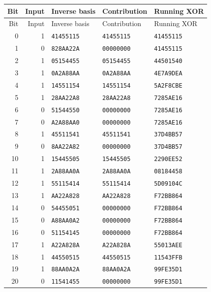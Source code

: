 \begingroup\small
\begin{longtable}{rrlll}
\toprule
Bit & Input & Inverse basis & Contribution & Running XOR\\
\midrule
\endfirsthead
\toprule
Bit & Input & Inverse basis & Contribution & Running XOR\\
\midrule
\endhead
0 & 1 & \texttt{41455115} & \texttt{41455115} & \texttt{41455115}\\
1 & 0 & \texttt{828AA22A} & \texttt{00000000} & \texttt{41455115}\\
2 & 1 & \texttt{05154455} & \texttt{05154455} & \texttt{44501540}\\
3 & 1 & \texttt{0A2A88AA} & \texttt{0A2A88AA} & \texttt{4E7A9DEA}\\
4 & 1 & \texttt{14551154} & \texttt{14551154} & \texttt{5A2F8CBE}\\
5 & 1 & \texttt{28AA22A8} & \texttt{28AA22A8} & \texttt{7285AE16}\\
6 & 0 & \texttt{51544550} & \texttt{00000000} & \texttt{7285AE16}\\
7 & 0 & \texttt{A2A88AA0} & \texttt{00000000} & \texttt{7285AE16}\\
8 & 1 & \texttt{45511541} & \texttt{45511541} & \texttt{37D4BB57}\\
9 & 0 & \texttt{8AA22A82} & \texttt{00000000} & \texttt{37D4BB57}\\
10 & 1 & \texttt{15445505} & \texttt{15445505} & \texttt{2290EE52}\\
11 & 1 & \texttt{2A88AA0A} & \texttt{2A88AA0A} & \texttt{08184458}\\
12 & 1 & \texttt{55115414} & \texttt{55115414} & \texttt{5D09104C}\\
13 & 1 & \texttt{AA22A828} & \texttt{AA22A828} & \texttt{F72BB864}\\
14 & 0 & \texttt{54455051} & \texttt{00000000} & \texttt{F72BB864}\\
15 & 0 & \texttt{A88AA0A2} & \texttt{00000000} & \texttt{F72BB864}\\
16 & 0 & \texttt{51154145} & \texttt{00000000} & \texttt{F72BB864}\\
17 & 1 & \texttt{A22A828A} & \texttt{A22A828A} & \texttt{55013AEE}\\
18 & 1 & \texttt{44550515} & \texttt{44550515} & \texttt{11543FFB}\\
19 & 1 & \texttt{88AA0A2A} & \texttt{88AA0A2A} & \texttt{99FE35D1}\\
20 & 0 & \texttt{11541455} & \texttt{00000000} & \texttt{99FE35D1}\\

\end{longtable}
